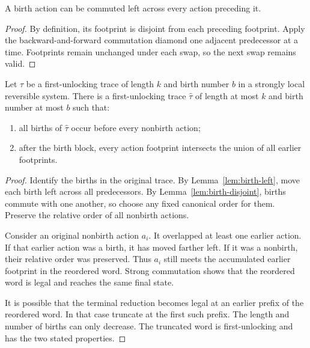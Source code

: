 \begin{lemma}
\label{lem:birth-left}
A birth action can be commuted left across every action preceding it.
\end{lemma}

\begin{proof}
By definition, its footprint is disjoint from each preceding footprint.  Apply
the backward-and-forward commutation diamond one adjacent predecessor at a
time.  Footprints remain unchanged under each swap, so the next swap remains
valid.
\end{proof}

\begin{theorem}
\label{thm:birth-front}
Let $\tau$ be a first-unlocking trace of length $k$ and birth number $b$ in a
strongly local reversible system.  There is a first-unlocking trace
$\widehat\tau$ of length at most $k$ and birth number at most $b$ such that:
\begin{enumerate}
\item all births of $\widehat\tau$ occur before every nonbirth action;
\item after the birth block, every action footprint intersects the union of all
      earlier footprints.
\end{enumerate}
\end{theorem}

\begin{proof}
Identify the births in the original trace.  By Lemma~\ref{lem:birth-left}, move
each birth left across all predecessors.  By
Lemma~\ref{lem:birth-disjoint}, births commute with one another, so choose any
fixed canonical order for them.  Preserve the relative order of all nonbirth
actions.

Consider an original nonbirth action $a_i$.  It overlapped at least one earlier
action.  If that earlier action was a birth, it has moved farther left.  If it
was a nonbirth, their relative order was preserved.  Thus $a_i$ still meets the
accumulated earlier footprint in the reordered word.  Strong commutation shows
that the reordered word is legal and reaches the same final state.

It is possible that the terminal reduction becomes legal at an earlier prefix
of the reordered word.  In that case truncate at the first such prefix.  The
length and number of births can only decrease.  The truncated word is
first-unlocking and has the two stated properties.
\end{proof}


